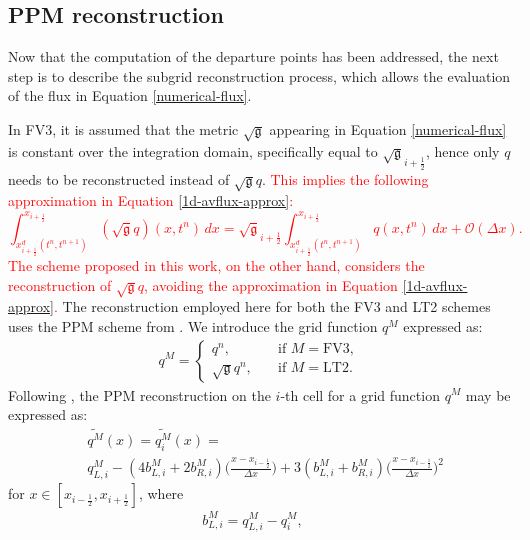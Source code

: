 \documentclass[preprint,12pt]{elsarticle}
\begin{document}
\begin{linenumbers}
\subsection{PPM reconstruction}
\label{ppm-recon}
Now that the computation of the departure points has been addressed, the next step is to describe the subgrid reconstruction process, which allows the evaluation of the flux in Equation \eqref{numerical-flux}.

In FV3, it is assumed that the metric $\sqrt{\mathfrak{g}}$ appearing in Equation \eqref{numerical-flux} is constant over the integration domain, specifically equal to $\sqrt{\mathfrak{g}}_{i+\frac{1}{2}}$, hence only $q$ needs to be reconstructed instead of $\sqrt{\mathfrak{g}}q$.
\textcolor{red}{ This implies the following approximation in Equation \eqref{1d-avflux-approx}:
\begin{equation}
	\label{1d-avflux-approx}
	\int^{x_{i+\frac{1}{2}}}_{ x_{i+\frac{1}{2}}^d(t^n,t^{n+1})} (\sqrt{\mathfrak{g}}q)(x,t^n)\,dx = 
	\sqrt{\mathfrak{g}}_{i+\frac{1}{2}}
	\int^{x_{i+\frac{1}{2}}}_{ x_{i+\frac{1}{2}}^d(t^n,t^{n+1})} q(x,t^n)\,dx + \mathcal{O}(\Delta x).
\end{equation}
The scheme proposed in this work, on the other hand, considers the reconstruction of $\sqrt{\mathfrak{g}}q$, avoiding the approximation in Equation \eqref{1d-avflux-approx}.}
The reconstruction employed here for both the FV3 and LT2 schemes uses the PPM scheme from \cite{colella:1984,carpenter:1990}.
We introduce the grid function $q^M$ expressed as:
\begin{align}
	\label{ppm_q_m}
    q^M = 
	\begin{cases}
        q^n,
		\quad &\text{if }{M=\text{FV3}},\\
        \sqrt{\mathfrak{g}}q^n,
		\quad &\text{if }{M=\text{LT2}}.
	\end{cases}
\end{align}
Following \cite{harris:2021}, the PPM reconstruction on the $i$-th cell for a grid function $q^M$ may be expressed as:
\begin{align}
	&\widetilde{q^M}(x) =
	\widetilde{q^M_i}(x) =  \nonumber \\
	\label{ppm-formula}
	&q_{L,i}^M -
	(4b_{L,i}^M +2b_{R,i}^M )
	\bigg(\frac{x-x_{i-\frac{1}{2}}}{\Delta x}\bigg)+
	3(b_{L,i}^M +b_{R,i}^M )
	\bigg(\frac{x-x_{i-\frac{1}{2}}}{\Delta x}\bigg)^2
\end{align}
for $x \in [x_{i-\frac{1}{2}},x_{i+\frac{1}{2}}]$, where
\begin{align}
	b_{L,i}^M = q_{L,i}^M-{q_i^M}, \quad 

\end{align}
\end{linenumbers}
\end{document}
